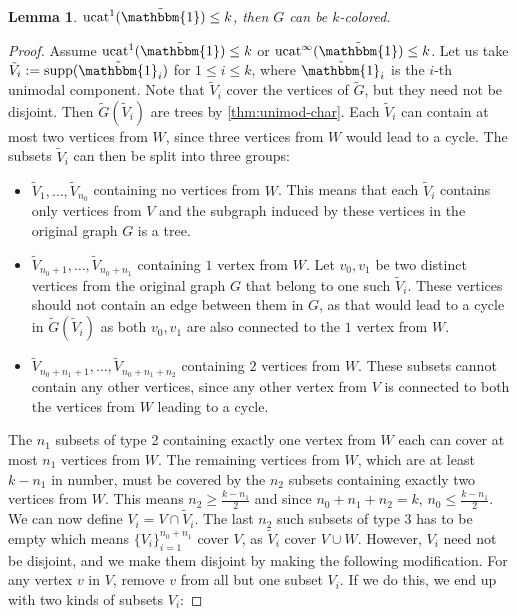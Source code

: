 \documentclass[11pt]{article}
\DeclareMathOperator{\ucat}{ucat}
\newtheorem{lem}[thm]{Lemma}
\newcommand{\supp}{\text{supp}}
\begin{document}
\begin{lem}
\label{l:p2}
$\ucat^1(\tilde{\mathbbm{1}}) \leq k$, then $G$ can be $k$-colored.
\end{lem}
\begin{proof}
Assume $\ucat^1(\tilde{\mathbbm{1}}) \leq k$ or $\ucat^{\infty}(\tilde{\mathbbm{1}}) \leq k$. Let us take $\tilde{V}_i := \supp(\tilde{\mathbbm{1}}_i)$ for $1 \leq i \leq k$, where $\tilde{\mathbbm{1}}_i$ is the $i$-th unimodal component. Note that $\tilde{V}_i$ cover the vertices of $\tilde{G}$, but they need not be disjoint. Then $\tilde{G}(\tilde{V}_i)$ are trees by \ref{thm:unimod-char}. Each $\tilde{V}_i$ can contain at most two vertices from $W$, since three vertices from $W$ would lead to a cycle. The subsets $\tilde{V}_i$ can then be split into three groups:
\begin{itemize}[align=left, leftmargin=*]
\item[\textit{Subsets 1:}] $\tilde{V}_1, \ldots, \tilde{V}_{n_0}$ containing no vertices from $W$. This means that each $\tilde{V}_i$ contains only vertices from $V$ and the subgraph induced by these vertices in the original graph $G$ is a tree.
\item[\textit{Subsets 2:}] $\tilde{V}_{n_0+1}, \ldots, \tilde{V}_{n_0+n_1}$ containing $1$ vertex from $W$. Let $v_0, v_1$ be two distinct vertices from the original graph $G$ that belong to one such $\tilde{V}_i$. These vertices should not contain an edge between them in $G$, as that would lead to a cycle in $\tilde{G}(\tilde{V}_i)$ as both $v_0, v_1$ are also connected to the $1$ vertex from $W$.
\item[\textit{Subsets 3:}]  $\tilde{V}_{n_0+n_1+1}, \ldots, \tilde{V}_{n_0+n_1+n_2}$ containing $2$ vertices from $W$. These subsets cannot contain any other vertices, since any other vertex from $V$ is connected to both the vertices from $W$ leading to a cycle.
\end{itemize}
The $n_1$ subsets of type 2 containing exactly one vertex from $W$ each can cover at most $n_1$ vertices from $W$. The remaining vertices from $W$, which are at least $k-n_1$ in number, must be covered by the $n_2$ subsets containing exactly two vertices from $W$. This means $n_2 \geq \frac{k-n_1}{2}$ and since $n_0+n_1+n_2 = k$, $n_0 \leq  \frac{k-n_1}{2}$. We can now define $V_i = V \cap \tilde{V}_i$. The last $n_2$ such subsets of type 3 has to be empty which means $\{ V_i \}_{i=1}^{n_0+n_1}$ cover $V$, as $\tilde{V}_i$ cover $V \cup W$. However, $V_i$ need not be disjoint, and we make them disjoint by making the following modification. For any vertex $v$ in $V$, remove $v$ from all but one subset $V_i$. If we do this, we end up with two kinds of subsets $V_i$:

\end{proof}
\end{document}
